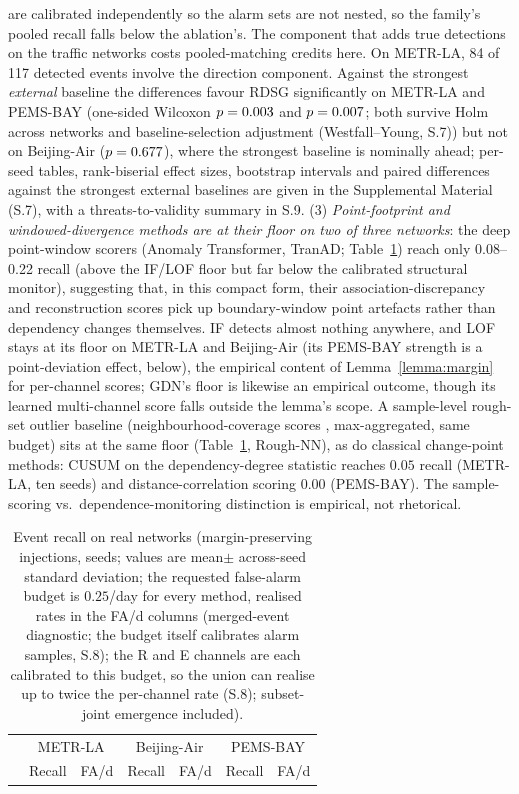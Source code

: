 \documentclass[11pt,a4paper]{article}
\newcommand{\RDSG}{RDSG}
\begin{document}
are calibrated independently so the alarm sets are not nested, so
the family's pooled recall falls below the ablation's. The component that adds true detections on the traffic networks costs
pooled-matching credits here. On METR-LA, 84 of 117 detected events involve
the direction component. Against the strongest \emph{external} baseline
the differences favour \RDSG{} significantly on METR-LA and
PEMS-BAY (one-sided Wilcoxon $p=0.003$ and $p=0.007$; both survive Holm across networks and baseline-selection adjustment (Westfall--Young, S.7))
but not on Beijing-Air ($p=0.677$), where the strongest
baseline is nominally ahead; per-seed tables,
rank-biserial effect sizes, bootstrap intervals and paired differences
against the strongest external baselines are given in the Supplemental
Material (S.7), with a threats-to-validity summary in S.9. (3) \emph{Point-footprint and windowed-divergence methods are at
their floor on two of three networks}: the deep point-window scorers (Anomaly Transformer, TranAD; Table~\ref{tab:e2}) reach only 0.08--0.22 recall (above the IF/LOF floor but far below the calibrated structural monitor), suggesting that, in this compact form, their association-discrepancy
and reconstruction scores pick up boundary-window point artefacts rather
than dependency changes themselves. IF detects almost
nothing anywhere, and LOF stays at its floor on METR-LA and Beijing-Air
(its PEMS-BAY strength is a point-deviation effect, below), the empirical content of
Lemma~\ref{lemma:margin} for per-channel scores; GDN's floor is likewise an
empirical outcome, though its learned multi-channel score falls outside the
lemma's scope. A sample-level
rough-set outlier baseline (neighbourhood-coverage scores \citep{hu2008neighborhood},
max-aggregated, same budget) sits at
the same floor (Table~\ref{tab:e2}, Rough-NN), as do classical change-point
methods: CUSUM on the dependency-degree statistic reaches $0.05$ recall
(METR-LA, ten seeds) and distance-correlation scoring $0.00$ (PEMS-BAY).
The sample-scoring vs.\ dependence-monitoring distinction is empirical,
not rhetorical.

\begin{table}[t]\centering\small
\caption{Event recall on real networks (margin-preserving injections,
\eTwoNSeeds{}
seeds; values are mean$\pm$ across-seed standard deviation; the requested false-alarm budget is $0.25$/day for every method,
realised rates in the FA/d columns (merged-event diagnostic; the budget
itself calibrates alarm samples, S.8); the R and E channels are each calibrated
to this budget, so the union can realise up to twice the per-channel rate
(S.8); subset-joint emergence included).}
\label{tab:e2}
\begin{tabular}{lcccccc}
\hline
 & \multicolumn{2}{c}{METR-LA} & \multicolumn{2}{c}{Beijing-Air} & \multicolumn{2}{c}{PEMS-BAY}\\
 & Recall & FA/d & Recall & FA/d & Recall & FA/d\\
\hline

\end{tabular}
\end{table}
\end{document}
